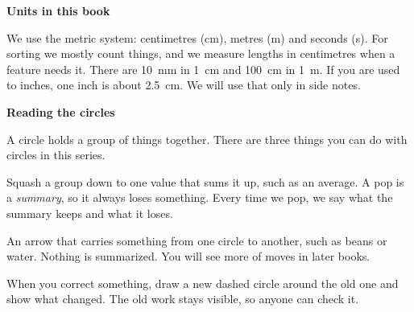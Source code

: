 {\sans\bfseries\large\color{sky!70!black} Units in this book}\par
We use the metric system: centimetres (cm), metres (m) and seconds (s). For sorting we mostly count things, and we measure lengths in centimetres when a feature needs it.
There are 10~mm in 1~cm and 100~cm in 1~m. If you are used to inches, one inch is about 2.5~cm. We will use that only in side notes.
\clearpage

\thispagestyle{plain}\label{circlecard}
{\sans\bfseries\LARGE\color{ink} Reading the circles}\par\vspace{0.1cm}
A circle holds a group of things together. There are three things you can do with circles in this series.

\begin{center}
\end{center}

\begin{description}[leftmargin=0pt,itemsep=0.4em,style=unboxed]
\item[\textcolor{tomato}{\sans\bfseries Pop}] Squash a group down to one value that sums it up, such as an average. A pop is a \emph{summary}, so it always loses something. Every time we pop, we say what the summary keeps and what it loses.
\item[\textcolor{sky!70!black}{\sans\bfseries Move}] An arrow that carries something from one circle to another, such as beans or water. Nothing is summarized. You will see more of moves in later books.
\item[\textcolor{tangerine!80!black}{\sans\bfseries Wrap}] When you correct something, draw a new dashed circle around the old one and show what changed. The old work stays visible, so anyone can check it.
\end{description}

